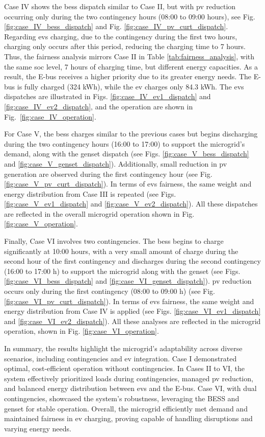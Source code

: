 \documentclass[preprint, 12pt, 3p]{elsarticle}
\begin{document}
Case IV shows the \gls{bess} dispatch similar to Case II, but with \gls{pv} reduction occurring only during the two contingency hours (08:00 to 09:00 hours), see Fig. \ref{fig:case_IV_bess_dispatch} and Fig. \ref{fig:case_IV_pv_curt_dispatch}. Regarding \glspl{ev} charging, due to the contingency during the first two hours, charging only occurs after this period, reducing the charging time to 7 hours. Thus, the fairness analysis mirrors Case II in Table \ref{tab:fairness_analysis}, with the same \gls{soc} level, 7 hours of charging time, but different energy capacities. As a result, the E-bus receives a higher priority due to its greater energy needs. The E-bus is fully charged (324 kWh), while the \gls{ev} charges only 84.3 kWh. The \glspl{ev} dispatches are illustrated in Figs.
\ref{fig:case_IV_ev1_dispatch} and \ref{fig:case_IV_ev2_dispatch}, and the operation are shown in Fig.~\ref{fig:case_IV_operation}.

For Case V, the \gls{bess} charges similar to the previous cases but begins discharging during the two contingency hours (16:00 to 17:00) to support the microgrid's demand, along with the \gls{genset} dispatch (see Figs. \ref{fig:case_V_bess_dispatch} and \ref{fig:case_V_genset_dispatch}). Additionally, small reduction in \gls{pv} generation are observed during the first contingency hour (see Fig. \ref{fig:case_V_pv_curt_dispatch}). In terms of \glspl{ev} fairness, the same weight and energy distribution from Case III is repeated (see Figs. \ref{fig:case_V_ev1_dispatch} and \ref{fig:case_V_ev2_dispatch}). All these dispatches are reflected in the overall microgrid operation shown in Fig. \ref{fig:case_V_operation}.

Finally, Case VI involves two contingencies. The \gls{bess} begins to charge significantly at 
10:00 hours, with a very small amount of charge during the second hour of the first contingency and discharges during the second contingency (16:00 to 17:00 h) to support the microgrid along with the \gls{genset} (see Figs. \ref{fig:case_VI_bess_dispatch} and \ref{fig:case_VI_genset_dispatch}). \gls{pv} reduction occurs only during the first contingency (08:00 to 09:00 h) (see Fig. \ref{fig:case_VI_pv_curt_dispatch}). In terms of \glspl{ev} fairness, the same weight and energy distribution from Case IV is applied (see Figs. \ref{fig:case_VI_ev1_dispatch} and \ref{fig:case_VI_ev2_dispatch}). All these analyses are reflected in the microgrid operation, shown in Fig. \ref{fig:case_VI_operation}.


In summary, the results highlight the microgrid’s adaptability across diverse scenarios, including contingencies and \gls{ev} integration. Case I demonstrated optimal, cost-efficient operation without contingencies. In Cases II to VI, the system effectively prioritized loads during contingencies, managed \gls{pv} reduction, and balanced energy distribution between \glspl{ev} and the E-bus. Case VI, with dual contingencies, showcased the system’s robustness, leveraging the BESS and \gls{genset} for stable operation. Overall, the microgrid efficiently met demand and maintained fairness in \gls{ev} charging, proving capable of handling disruptions and varying energy needs.
\end{document}
